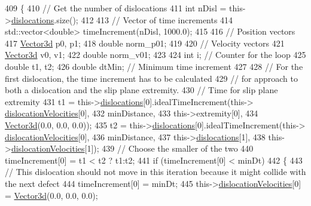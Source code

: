 \begin{DoxyCode}
409  \{
410    \textcolor{comment}{// Get the number of dislocations}
411    \textcolor{keywordtype}{int} nDisl = this->\hyperlink{classSlipPlane_ad92c7c409f7e161db449528389180910}{dislocations}.size();
412 
413    \textcolor{comment}{// Vector of time increments}
414    std::vector<double> timeIncrement(nDisl, 1000.0);
415 
416    \textcolor{comment}{// Position vectors}
417    \hyperlink{classVector3d}{Vector3d} p0, p1;
418    \textcolor{keywordtype}{double} norm\_p01;
419 
420    \textcolor{comment}{// Velocity vectors}
421    \hyperlink{classVector3d}{Vector3d} v0, v1;
422    \textcolor{keywordtype}{double} norm\_v01;
423 
424    \textcolor{keywordtype}{int} i;         \textcolor{comment}{// Counter for the loop}
425    \textcolor{keywordtype}{double} t1, t2;
426    \textcolor{keywordtype}{double} dtMin;  \textcolor{comment}{// Minimum time increment}
427 
428    \textcolor{comment}{// For the first dislocation, the time increment has to be calculated}
429    \textcolor{comment}{// for approach to both a dislocation and the slip plane extremity.}
430    \textcolor{comment}{// Time for slip plane extremity}
431    t1 = this->\hyperlink{classSlipPlane_ad92c7c409f7e161db449528389180910}{dislocations}[0].idealTimeIncrement(this->
      \hyperlink{classSlipPlane_a107a3883169bf918664cb4e4fd4bd72c}{dislocationVelocities}[0],
432                                                  minDistance,
433                                                  this->extremity[0],
434                                                  \hyperlink{classVector3d}{Vector3d}(0.0, 0.0, 0.0));
435    t2 = this->\hyperlink{classSlipPlane_ad92c7c409f7e161db449528389180910}{dislocations}[0].idealTimeIncrement(this->
      \hyperlink{classSlipPlane_a107a3883169bf918664cb4e4fd4bd72c}{dislocationVelocities}[0],
436                                                  minDistance,
437                                                  this->\hyperlink{classSlipPlane_ad92c7c409f7e161db449528389180910}{dislocations}[1],
438                                                  this->\hyperlink{classSlipPlane_a107a3883169bf918664cb4e4fd4bd72c}{dislocationVelocities}[1]);
439    \textcolor{comment}{// Choose the smaller of the two}
440    timeIncrement[0] = t1 < t2 ? t1:t2;
441    \textcolor{keywordflow}{if} (timeIncrement[0] < minDt)
442      \{
443        \textcolor{comment}{// This dislocation should not move in this iteration because it might collide with the next defect}
444        timeIncrement[0] = minDt;
445        this->\hyperlink{classSlipPlane_a107a3883169bf918664cb4e4fd4bd72c}{dislocationVelocities}[0] = \hyperlink{classVector3d}{Vector3d}(0.0, 0.0, 0.0);

\end{DoxyCode}
